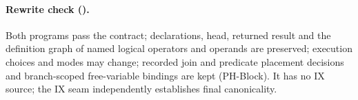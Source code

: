 \paragraph{Rewrite check ().} Both programs
pass the contract; declarations, head, returned result and the definition graph
of named logical operators and operands are preserved; execution choices and
modes may change; recorded join and predicate placement decisions and
branch-scoped free-variable bindings are kept (PH-Block). It has no IX source;
the IX seam independently establishes final canonicality.

